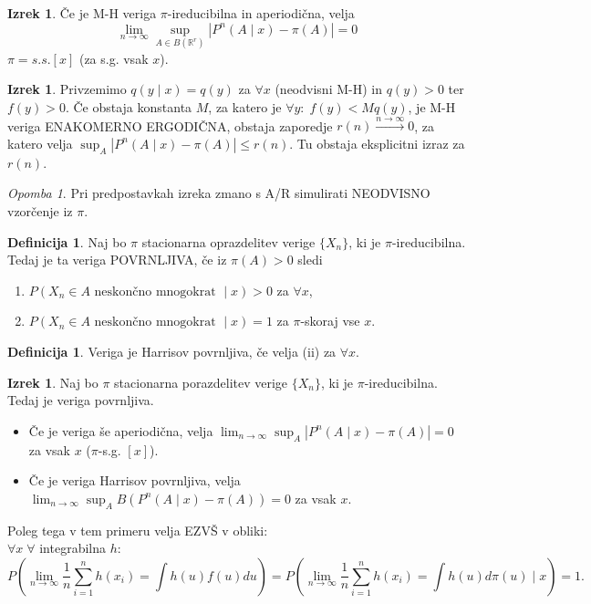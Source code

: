 \documentclass[a4paper, 12pt]{book}
\theoremstyle{definition}
\newtheorem{defn}[counter]{Definicija}
\newtheorem{theorem}[counter]{Izrek}
\theoremstyle{remark}
\newtheorem*{rem}{Opomba}
\newcommand{\R}{\mathbb{R}}
\begin{document}
\begin{theorem}
  Če je M-H veriga $\pi$-ireducibilna in aperiodična, velja
  \begin{equation*}
    \lim_{n \to \infty} \sup_{A \in B\left(\R^r\right)} \left|P^n(A \mid x) - \pi(A)\right| = 0
  \end{equation*}
  $\pi = s.s. [x]$ (za s.g. vsak $x$).
\end{theorem}
\begin{theorem}
  Privzemimo $q(y \mid x) = q(y)$ za $\forall x$ (neodvisni M-H) in $q(y) > 0$ ter $f(y) > 0$.
  Če obstaja konstanta $M$, za katero je $\forall y: \; f(y) < M q(y)$, je M-H veriga ENAKOMERNO ERGODIČNA,
  obstaja zaporedje $r(n) \stackrel{n \to \infty}{\to} 0$, za katero velja $\sup_A \left|P^n(A \mid x) - \pi(A)\right| \leq r(n)$.
  Tu obstaja eksplicitni izraz za $r(n)$.
\end{theorem}
\begin{rem}
  Pri predpostavkah izreka zmano s A/R simulirati NEODVISNO vzorčenje iz $\pi$.
\end{rem}
\begin{defn}
  Naj bo $\pi$ stacionarna oprazdelitev verige $\{X_n\}$, ki je $\pi$-ireducibilna.
  Tedaj je ta veriga POVRNLJIVA, če iz $\pi(A) > 0$ sledi
  \begin{enumerate}[label=(\roman*)]
    \item $P(X_n \in A \text{ neskončno mnogokrat } \mid x) > 0$ za $\forall x$,
    \item $P(X_n \in A \text{ neskončno mnogokrat } \mid x) = 1$ za $\pi$-skoraj vse $x$.
  \end{enumerate}
\end{defn}
\begin{defn}
  Veriga je Harrisov povrnljiva, če velja (ii) za $\forall x$.
\end{defn}
\begin{theorem}
  Naj bo $\pi$ stacionarna porazdelitev verige $\{X_n\}$, ki je $\pi$-ireducibilna.
  Tedaj je veriga povrnljiva.
  \begin{itemize}
    \item Če je veriga še aperiodična, velja $\lim_{n \to \infty} \sup_A \left|P^n(A \mid x) - \pi(A)\right| = 0$ za vsak $x$
      ($\pi$-s.g. $[x]$).
    \item Če je veriga Harrisov povrnljiva,
      velja $\lim_{n \to \infty} \sup_A B\left(P^n(A \mid x) - \pi(A)\right) = 0$ za vsak $x$.
  \end{itemize}
  Poleg tega v tem primeru velja EZVŠ v obliki: \\
  $\forall x\; \forall$ integrabilna $h$:
  \begin{equation*}
    P\left(\lim_{n \to \infty} \frac{1}{n} \sum_{i=1}^{n} h(x_i) = \int h(u) f(u) du\right)
    = P\left(\lim_{n \to \infty} \frac{1}{n} \sum_{i=1}^{n} h(x_i) = \int h(u) d\pi(u) \mid x\right) = 1.
  \end{equation*}
\end{theorem}
\end{document}
